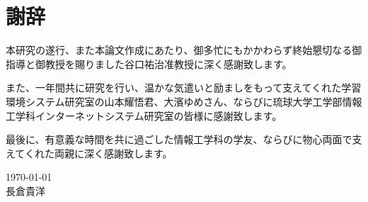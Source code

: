 \chapter*{謝辞}
\thispagestyle{empty}

\hspace{1zw}本研究の遂行、また本論文作成にあたり、御多忙にもかかわらず終始懇切なる御指導と御教授を賜りました谷口祐治准教授に深く感謝致します。

また、一年間共に研究を行い、温かな気遣いと励ましをもって支えてくれた学習環境システム研究室の山本耀悟君、大濱ゆめさん、ならびに琉球大学工学部情報工学科インターネットシステム研究室の皆様に感謝致します。

最後に、有意義な時間を共に過ごした情報工学科の学友、ならびに物心両面で支えてくれた両親に深く感謝致します。

\begin{flushright}
\today \\ 長倉貴洋
\end{flushright}